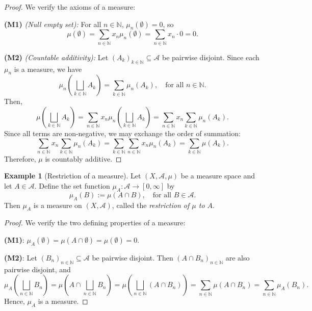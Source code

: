 \documentclass[12pt]{article}
\theoremstyle{definition}
\newtheorem{example}{Example}[section]
\begin{document}
\begin{proof}
We verify the axioms of a measure:

\textbf{(M1)} \emph{(Null empty set):} For all \( n \in \mathbb{N} \), \( \mu_n(\emptyset) = 0 \), so
\[
\mu(\emptyset) = \sum_{n \in \mathbb{N}} x_n \mu_n(\emptyset) = \sum_{n \in \mathbb{N}} x_n \cdot 0 = 0.
\]

\textbf{(M2)} \emph{(Countable additivity):} Let \( (A_k)_{k \in \mathbb{N}} \subseteq \mathcal{A} \) be pairwise disjoint. Since each \( \mu_n \) is a measure, we have
\[
\mu_n\left( \bigsqcup_{k \in \mathbb{N}} A_k \right) = \sum_{k \in \mathbb{N}} \mu_n(A_k), \quad \text{for all } n \in \mathbb{N}.
\]
Then,
\[
\mu\left( \bigsqcup_{k \in \mathbb{N}} A_k \right)
= \sum_{n \in \mathbb{N}} x_n \mu_n\left( \bigsqcup_{k \in \mathbb{N}} A_k \right)
= \sum_{n \in \mathbb{N}} x_n \sum_{k \in \mathbb{N}} \mu_n(A_k).
\]
Since all terms are non-negative, we may exchange the order of summation:
\[
\sum_{n \in \mathbb{N}} x_n \sum_{k \in \mathbb{N}} \mu_n(A_k)
= \sum_{k \in \mathbb{N}} \sum_{n \in \mathbb{N}} x_n \mu_n(A_k)
= \sum_{k \in \mathbb{N}} \mu(A_k).
\]
Therefore, \( \mu \) is countably additive.
\end{proof}


\medskip
\begin{example}[Restriction of a measure]
Let \((X, \mathcal{A}, \mu)\) be a measure space and let \(A \in \mathcal{A}\). Define the set function \(\mu_{\!A} : \mathcal{A} \to [0, \infty]\) by
\[
\mu_{\!A}(B) := \mu(A \cap B), \quad \text{for all } B \in \mathcal{A}.
\]
Then \(\mu_{\!A}\) is a measure on \((X, \mathcal{A})\), called the \emph{restriction of \(\mu\) to \(A\)}.
\end{example}

\begin{proof}
We verify the two defining properties of a measure:

\textbf{(M1)}: \(\mu_{\!A}(\emptyset) = \mu(A \cap \emptyset) = \mu(\emptyset) = 0\).

\medskip
\textbf{(M2)}: Let \((B_n)_{n \in \mathbb{N}} \subseteq \mathcal{A}\) be pairwise disjoint. Then \((A \cap B_n)_{n \in \mathbb{N}}\) are also pairwise disjoint, and
\[
\mu_{\!A}\left( \bigsqcup_{n \in \mathbb{N}} B_n \right)
= \mu\left( A \cap \bigsqcup_{n \in \mathbb{N}} B_n \right)
= \mu\left( \bigsqcup_{n \in \mathbb{N}} (A \cap B_n) \right)
= \sum_{n \in \mathbb{N}} \mu(A \cap B_n)
= \sum_{n \in \mathbb{N}} \mu_{\!A}(B_n).
\]
Hence, \(\mu_{\!A}\) is a measure.
\end{proof}
\end{document}
